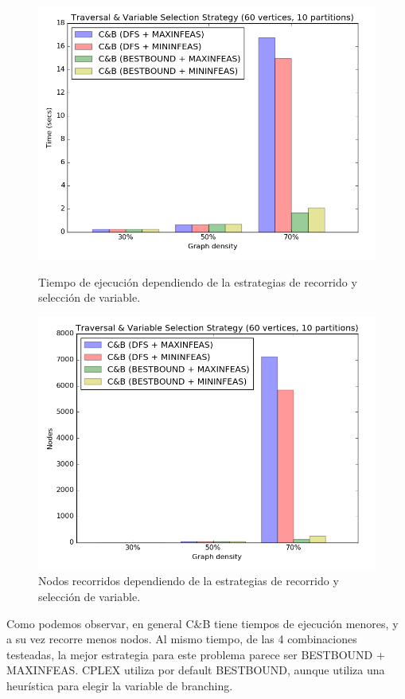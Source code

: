\begin{figure}[h]
\begin{minipage}[b]{0.49\textwidth}
    \includegraphics[width=\textwidth]{img/9-tree_v60_p10_i1_l30_s2.png}
  \caption{Tiempo de ejecución dependiendo de la estrategias de recorrido y selección de variable.}
  \end{minipage}
  \hfill
  \begin{minipage}[b]{0.49\textwidth}
    \includegraphics[width=\textwidth]{img/9-tree_v60_p10_i1_l30_s2_nodes.png}
  \caption{Nodos recorridos dependiendo de la estrategias de recorrido y selección de variable.}
  \end{minipage}
\end{figure}

Como podemos observar, en general C\&B tiene tiempos de ejecución menores, y a su vez recorre menos nodos. Al mismo tiempo, de las 4 combinaciones testeadas, la mejor estrategia para este problema parece ser BESTBOUND + MAXINFEAS. CPLEX utiliza por default BESTBOUND, aunque utiliza una heurística para elegir la variable de branching. 

